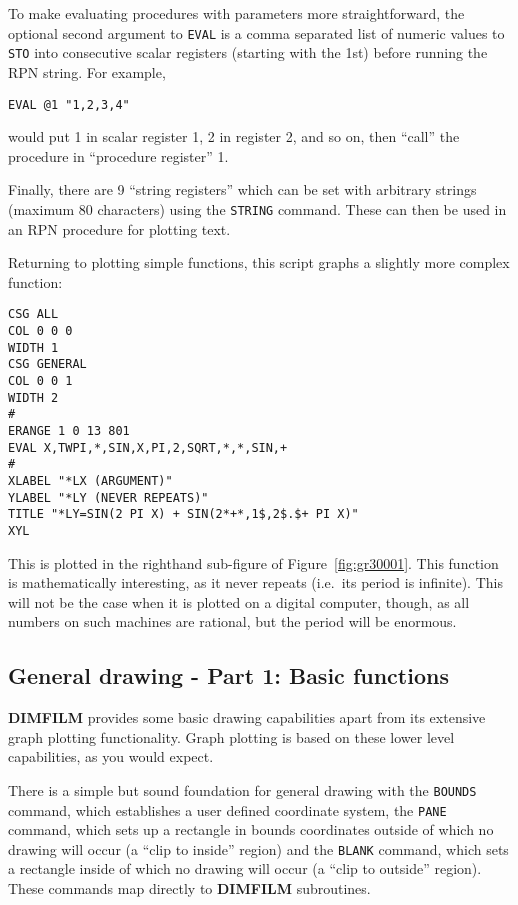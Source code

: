 \documentclass[a4paper,twoside,11pt]{article}
\newcommand{\newpara}{\par\vspace{4mm}\noindent}
\begin{document}
\newpara
To make evaluating procedures with parameters more straightforward, the
optional second argument to \texttt{EVAL} is a comma separated list of
numeric values to \texttt{STO} into consecutive scalar registers
(starting with the 1st) before running the RPN string. For example,

\begin{lstlisting}
EVAL @1 "1,2,3,4"
\end{lstlisting}

\newpara
would put 1 in scalar register 1, 2 in register 2, and so on, then
``call'' the procedure in ``procedure register'' 1.

\newpara
Finally, there are 9 ``string registers'' which can be set with
arbitrary strings (maximum 80 characters) using the \texttt{STRING}
command. These can then be used in an RPN procedure for plotting text.

\newpara
Returning to plotting simple functions, this script graphs a slightly
more complex function:

\begin{lstlisting}
CSG ALL
COL 0 0 0
WIDTH 1
CSG GENERAL
COL 0 0 1
WIDTH 2
#
ERANGE 1 0 13 801
EVAL X,TWPI,*,SIN,X,PI,2,SQRT,*,*,SIN,+
#
XLABEL "*LX (ARGUMENT)"
YLABEL "*LY (NEVER REPEATS)"
TITLE "*LY=SIN(2 PI X) + SIN(2*+*,1$,2$.$+ PI X)"
XYL
\end{lstlisting}

\newpara
This is plotted in the righthand sub-figure of Figure~\ref{fig:gr30001}.
This function is
mathematically interesting, as it never repeats (i.e.~its period is
infinite). This will not be the case when it is plotted on a digital
computer, though, as all numbers on such machines are rational, but the
period will be enormous.


\subsection{General drawing - Part 1: Basic functions}\label{general-drawing---part-1-basic-functions}

\newpara
\textbf{DIMFILM} provides some basic drawing capabilities apart from its
extensive graph plotting functionality. Graph plotting is based on these
lower level capabilities, as you would expect.

\newpara
There is a simple but sound foundation for general drawing with the
\texttt{BOUNDS} command, which establishes a user defined coordinate
system, the \texttt{PANE} command, which sets up a rectangle in bounds
coordinates outside of which no drawing will occur (a ``clip to inside''
region) and the \texttt{BLANK} command, which sets a rectangle inside of
which no drawing will occur (a ``clip to outside'' region). These
commands map directly to \textbf{DIMFILM} subroutines.
\end{document}
